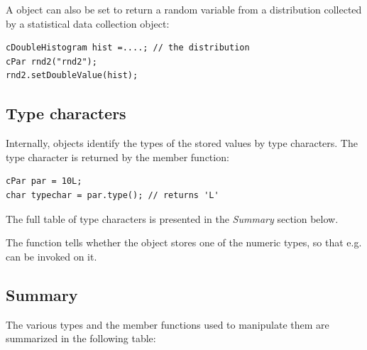 A  object can also be set to return a random variable from
a distribution collected by a statistical data collection object:

\begin{verbatim}
cDoubleHistogram hist =....; // the distribution
cPar rnd2("rnd2");
rnd2.setDoubleValue(hist);
\end{verbatim}


%
%
%

\subsection{Type characters}

Internally,  objects identify the types of the stored values
by type characters. The type character is returned by the 
member function:

\begin{verbatim}
cPar par = 10L;
char typechar = par.type(); // returns 'L'
\end{verbatim}

The full table of type characters is presented in the \textit{Summary}
section below.

The  function tells whether the object
stores one of the numeric types, so that e.g. 
can be invoked on it.



\subsection{Summary}

The various  types and the member functions used to manipulate them are summarized
in the following table:

